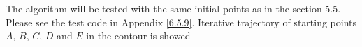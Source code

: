 The algorithm will be tested with the same initial
points as in the section 5.5. Please see the test code in Appendix \ref{6.5.9}. Iterative trajectory of starting points $A$, $B$, $C$, $D$ and $E$ in the contour is showed 
\begin{figure}[H]
\centering
{}
\quad
{}
\quad
\subfigure[$C(3,3)$]{
}
\end{figure}
